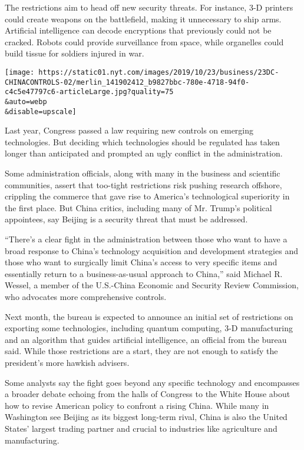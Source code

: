 The restrictions aim to head off new security threats. For instance, 3-D
printers could create weapons on the battlefield, making it unnecessary
to ship arms. Artificial intelligence can decode encryptions that
previously could not be cracked. Robots could provide surveillance from
space, while organelles could build tissue for soldiers injured in war.

\texttt{[image: https://static01.nyt.com/images/2019/10/23/business/23DC-CHINACONTROLS-02/merlin\_141902412\_b9827bbc-780e-4718-94f0-c4c5e47797c6-articleLarge.jpg?quality=75\\\&auto=webp\\\&disable=upscale]}

Last year, Congress passed a law requiring new controls on emerging
technologies. But deciding which technologies should be regulated has
taken longer than anticipated and prompted an ugly conflict in the
administration.

Some administration officials, along with many in the business and
scientific communities, assert that too-tight restrictions risk pushing
research offshore, crippling the commerce that gave rise to America's
technological superiority in the first place. But China critics,
including many of Mr. Trump's political appointees, say Beijing is a
security threat that must be addressed.

``There's a clear fight in the administration between those who want to
have a broad response to China's technology acquisition and development
strategies and those who want to surgically limit China's access to very
specific items and essentially return to a business-as-usual approach to
China,'' said Michael R. Wessel, a member of the U.S.-China Economic and
Security Review Commission, who advocates more comprehensive controls.

Next month, the bureau is expected to announce an initial set of
restrictions on exporting some technologies, including quantum
computing, 3-D manufacturing and an algorithm that guides artificial
intelligence, an official from the bureau said. While those restrictions
are a start, they are not enough to satisfy the president's more hawkish
advisers.

Some analysts say the fight goes beyond any specific technology and
encompasses a broader debate echoing from the halls of Congress to the
White House about how to revise American policy to confront a rising
China. While many in Washington see Beijing as its biggest long-term
rival, China is also the United States' largest trading partner and
crucial to industries like agriculture and manufacturing.

